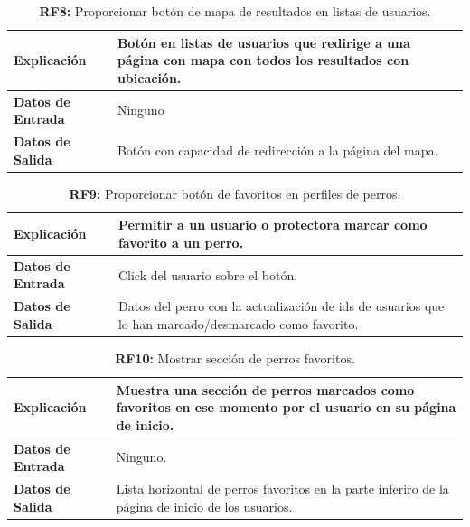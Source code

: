 \documentclass[a4paper, 12pt]{article}
\begin{document}
\begin{table}[H]
\captionsetup{justification=raggedright,singlelinecheck=false}
\caption{\textbf{RF8:}  Proporcionar botón de mapa de resultados en listas de usuarios.}
\label{tab:RF8}
	\begin{tabular}{|m{5cm}|m{10cm}|}
	\hline
	\textbf{Explicación} & Botón en listas de usuarios que redirige a una página con mapa con todos los resultados con ubicación. \\ 
	\hline
	\textbf{Datos de Entrada} & Ninguno \\ 
	\hline
	\textbf{Datos de Salida} & Botón con capacidad de redirección a la página del mapa. \\ 
	\hline
\end{tabular}
\end{table}

\begin{table}[H]
\captionsetup{justification=raggedright,singlelinecheck=false}
\caption{\textbf{RF9:} Proporcionar botón de favoritos en perfiles de perros.}
\label{tab:RF9}
	\begin{tabular}{|m{5cm}|m{10cm}|}
	\hline
	\textbf{Explicación} & Permitir a un usuario o protectora marcar como favorito a un perro. \\ 
	\hline
	\textbf{Datos de Entrada} & Click del usuario sobre el botón. \\ 
	\hline
	\textbf{Datos de Salida} & Datos del perro con la actualización de ids de usuarios que lo han marcado/desmarcado como favorito.\\ 
	\hline
\end{tabular}
\end{table}

\begin{table}[H]
\captionsetup{justification=raggedright,singlelinecheck=false}
\caption{\textbf{RF10:} Mostrar sección de perros favoritos. }
\label{tab:RF10}
	\begin{tabular}{|m{5cm}|m{10cm}|}
	\hline
	\textbf{Explicación} & Muestra una sección de perros marcados como favoritos en ese momento por el usuario en su página de inicio. \\ 
	\hline
	\textbf{Datos de Entrada} & Ninguno. \\ 
	\hline
	\textbf{Datos de Salida} & Lista horizontal de perros favoritos en la parte inferiro de la página de inicio de los usuarios. \\ 
	\hline
\end{tabular}
\end{table}
\end{document}
